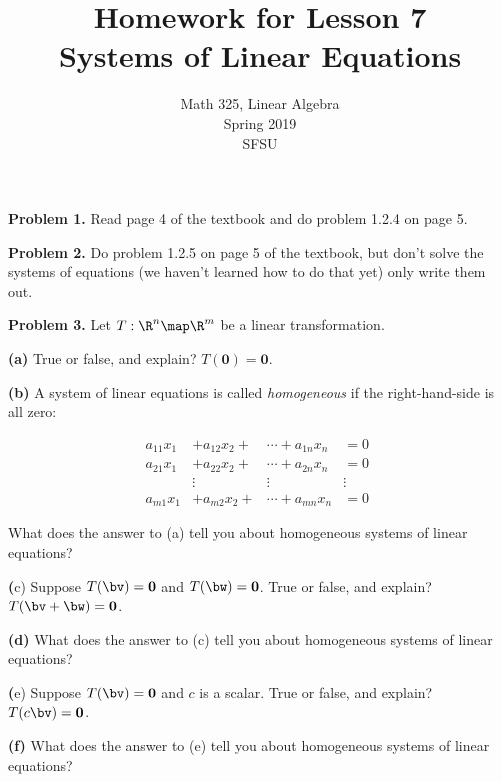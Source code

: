 \documentclass[oneside,12pt]{amsart}
\begin{document}
\title{Homework for Lesson 7 \\ Systems of Linear Equations}
\author{Math 325, Linear Algebra \\ Spring 2019\\ SFSU }
\date{}

\maketitle

\textbf{Problem 1.} Read page 4 of the textbook and do problem 1.2.4 on
page 5.

\bigskip
\bigskip
\bigskip
\bigskip
\bigskip
\bigskip
\bigskip
\bigskip
\bigskip
\bigskip

\textbf{Problem 2.} Do problem 1.2.5 on page 5 of the textbook, but don't
solve the systems of equations (we haven't learned how to do that yet)
only write them out.

\bigskip
\bigskip
\bigskip
\bigskip
\bigskip
\bigskip
\bigskip
\bigskip
\bigskip
\bigskip

\textbf{Problem 3.} Let $T:\R^n\map\R^m$ be a linear transformation.

\textbf{(a)} True or false, and explain? $T(\mathbf{0}) = \mathbf{0}$.

\bigskip

\textbf{(b)} A system of linear equations is called \emph{homogeneous} if the
right-hand-side is all zero:

\begin{align*}
 a_{11}x_1 &+ a_{12}x_2 + &\cdots + a_{1n} x_n &= 0\\
 a_{21}x_1 &+ a_{22}x_2 + &\cdots + a_{2n} x_n &= 0\\
 \quad &{ \vdots \quad} \quad &{ \vdots \quad} \quad  &{ \vdots \quad} \quad\\
 a_{m1}x_1 &+ a_{m2}x_2 + &\cdots + a_{mn} x_n &= 0
\end{align*}

What does the answer to (a) tell you about homogeneous systems of linear equations?

\bigskip

\textbf(c) Suppose $T(\bv) = \mathbf{0}$ and $T(\bw) = \mathbf{0}$.
True or false, and explain? $T(\bv + \bw) = \mathbf{0}$.

\bigskip

\textbf{(d)} What does the answer to (c) tell you about homogeneous systems of linear equations?

\bigskip

\textbf(e) Suppose $T(\bv) = \mathbf{0}$ and $c$ is a scalar.
True or false, and explain? $T(c\bv) = \mathbf{0}$.

\bigskip

\textbf{(f)} What does the answer to (e) tell you about homogeneous systems of linear equations?
\end{document}
